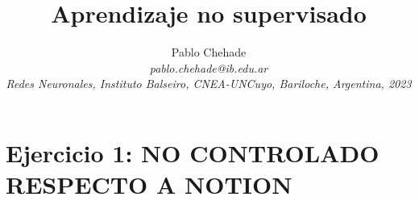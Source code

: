 \documentclass[aps,prb,twocolumn,superscriptaddress,floatfix,longbibliography]{revtex4-2}
\begin{document}
\newcommand{\mytitle}{Aprendizaje no supervisado}

\title{\mytitle}

\author{Pablo Chehade \\
    \small \textit{pablo.chehade@ib.edu.ar} \\
    \small \textit{Redes Neuronales, Instituto Balseiro, CNEA-UNCuyo, Bariloche, Argentina, 2023} \\}
    
\maketitle

\section*{Ejercicio 1: NO CONTROLADO RESPECTO A NOTION}
\end{document}
